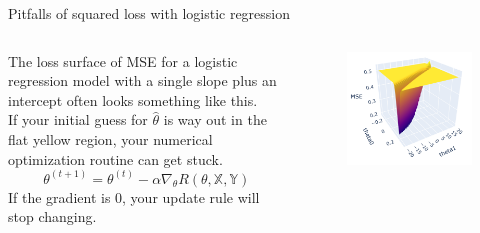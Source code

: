 \documentclass[aspectratio=169]{../latex_main/tntbeamer}  %
\begin{document}
	\begin{frame}{Pitfalls of squared loss with logistic regression}
	    \begin{columns}
	        \begin{column}{.4\textwidth}
	                The loss surface of MSE for a logistic regression model with a single slope plus an intercept often looks something like this.\\
	                \bigskip
	                If your initial guess for   $\hat{\theta}$  is way out in the flat yellow region, your numerical optimization routine can get stuck.
	                \begin{equation*}
	                    \theta^{(t+1)} = \theta^{(t)} - \alpha\nabla_\theta R(\theta,\mathbb{X},\mathbb{Y})
	                \end{equation*}
	                If the gradient is 0, your update rule will stop changing.
	        \end{column}
	        
	        
	        \begin{column}{.4\textwidth}
	                \begin{figure}
	                    \centering
	                    \includegraphics[scale=.5]{Bild12}
	                \end{figure}
	       \end{column}
	    \end{columns}
	\end{frame}
	
\end{document}
